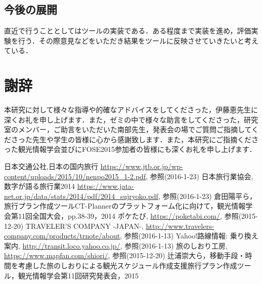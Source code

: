 \documentclass{funthesis}
\begin{document}
\section{今後の展開}
直近で行うこととしてはツールの実装である．ある程度まで実装を進め，評価実験を行う．その際意見などをいただき結果をツールに反映させていきたいと考えている．



\chapter*{謝辞}
本研究に対して様々な指導や的確なアドバイスをしてくださった，伊藤恵先生に深くお礼を申し上げます．また，ゼミの中で様々な助言をしてくださった，研究室のメンバー，ご助言をいただいた南部先生，発表会の場でご質問ご指摘してくださった先生や学生の皆様に心から感謝致します．また，本研究にご指摘くださった観光情報学会並びにFOSE2015参加者の皆様にも深くお礼を申し上げます．



\begin{thebibliography}{9}
日本交通公社,日本の国内旅行  {\url{https://www.jtb.or.jp/wp-content/uploads/2015/10/nenpo2015_1-2.pdf}}, 参照(2016-1-23)
日本旅行業協会,数字が語る旅行業2014  {\url{https://www.jata-net.or.jp/data/stats/2014/pdf/2014_sujryoko.pdf}}, 参照(2016-1-23)
  倉田陽平ら，旅行プラン作成ツールCT-Plannerのプラットフォーム化に向けて，観光情報学会第11回全国大会，pp.38-39，2014
ポケたび,  {\url{https://poketabi.com/}}, 参照(2015-12-20)
TRAVELER'S COMPANY -JAPAN-,  {\url{http://www.travelers-company.com/products/trnote/about}}, 参照(2016-1-13)
Yahoo!路線情報: 乗り換え案内,  {\url{http://transit.loco.yahoo.co.jp/}}, 参照(2016-1-13)
旅のしおり工房,  {\url{https://www.mapfan.com/shiori/}}, 参照(2015-12-20)
 辻浦崇大ら，移動手段・時間を考慮した旅のしおりによる観光スケジュール作成支援旅行プラン作成ツール，観光情報学会第11回研究発表会，2015

\end{thebibliography}


\appendix
\end{document}

